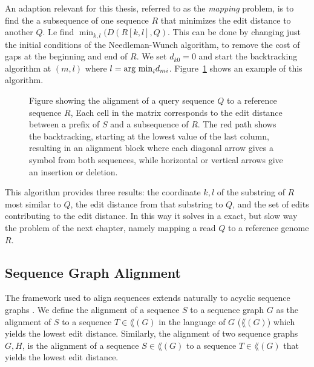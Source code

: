 An adaption relevant for this thesis, referred to as the \emph{mapping} problem, is to find the a subsequence of one sequence $R$ that minimizes the edit distance to another $Q$.
I.e find $\min_{k, l}(D(R[k, l], Q)$.
This can be done by changing just the initial conditions of the Needleman-Wunch algorithm, to remove the cost of gaps at the beginning and end of $R$.
We set $d_{k0} = 0$ and start the backtracking algorithm at $(m, l)$ where $l=\argmin_i d_{mi}$.
Figure~\ref{fig:needlemanmap} shows an example of this algorithm.
\begin{figure}
  \begin{tikzpicture}
    
  \end{tikzpicture}
  \caption{
    Figure showing the alignment of a query sequence $Q$ to a reference sequence $R$, 
    Each cell in the matrix corresponds to the edit distance between a prefix of $S$ and a subsequence of $R$. The red path shows the backtracking, starting at the lowest value of the last column, resulting in an alignment block where each diagonal arrow gives a symbol from both sequences, while horizontal or vertical arrows give an insertion or deletion.}
  \label{fig:needlemanmap}
\end{figure}
This algorithm provides three results: the coordinate $k, l$ of the substring of $R$ most similar to $Q$, the edit distance from that substring to $Q$, and the set of edits contributing to the edit distance.
In this way it solves in a exact, but slow way the problem of the next chapter, namely mapping a read $Q$ to a reference genome $R$.

\subsection{Sequence Graph Alignment}
The framework used to align sequences extends naturally to acyclic sequence graphs \cite{hein, poa}.
We define the alignment of a sequence $S$ to a sequence graph $G$ as the alignment of $S$ to a sequence $T \in \lang(G)$ in the language of $G$ ($\lang(G)$) which yields the lowest edit distance.
Similarly, the alignment of two sequence graphs $G, H$, is the alignment of a sequence $S \in \lang(G)$ to a sequence $T \in \lang(G)$ that yields the lowest edit distance. 

